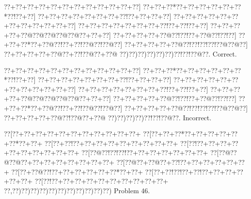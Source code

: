 \documentclass[a5paper]{article}
\begin{document}
\begin{center}
{\goo
\0??+\0??+\0??+\0??+\0??+\0??+\0??+\0??+\0??+\0??+\0??+\0??]
\0??+\0??+\0??*\0??+\0??+\0??+\0??+\0??+\0??*\0??!\0??+\0??]
\0??+\0??+\0??+\0??+\0??+\0??+\0??+\0??!\0??+\0??+\0??+\0??]
\0??+\0??+\0??+\0??+\0??+\0??+\0??+\0??+\0??+\0??+\0??+\0??]
\0??+\0??+\0??+\0??+\0??+\0??+\0??+\0??!\0??+\0??!\0??+\0??]
\0??+\0??+\0??+\0??+\0??@\0??@\0??@\0??@\0??@\0??+\0??+\0??]
\0??+\0??+\0??+\0??+\0??@\0??!\0??!\0??+\0??@\0??!\0??!\0??]
\0??+\0??+\0??*\0??+\0??@\0??!\0??+\0??!\0??@\0??!\0??@\0??]
\0??+\0??+\0??+\0??+\0??@\0??!\0??!\0??!\0??!\0??@\0??@\0??]
\0??+\0??+\0??+\0??+\0??@\0??+\0??!\0??@\0??+\0??@
\0??)\0??)\0??)\0??)\0??)\0??)\0??!\0??!\0??@\0??.
}
Correct. 

\end{center}
\begin{center}
{\goo
\0??+\0??+\0??+\0??+\0??+\0??+\0??+\0??+\0??+\0??+\0??+\0??]
\0??+\0??+\0??*\0??+\0??+\0??+\0??+\0??+\0??*\0??!\0??+\0??]
\0??+\0??+\0??+\0??+\0??+\0??+\0??+\0??!\0??+\0??+\0??+\0??]
\0??+\0??+\0??+\0??+\0??+\0??+\0??+\0??+\0??+\0??+\0??+\0??]
\0??+\0??+\0??+\0??+\0??+\0??+\0??+\0??!\0??+\0??!\0??+\0??]
\0??+\0??+\0??+\0??+\0??@\0??@\0??@\0??@\0??@\0??+\0??+\0??]
\0??+\0??+\0??+\0??+\0??@\0??!\0??!\0??+\0??@\0??!\0??!\0??]
\0??+\0??+\0??*\0??+\0??@\0??!\0??+\0??!\0??@\0??!\0??@\0??]
\0??+\0??+\0??+\0??+\0??@\0??!\0??!\0??!\0??!\0??@\0??@\0??]
\0??+\0??+\0??+\0??+\0??@\0??!\0??@\0??+\0??@
\0??)\0??)\0??)\0??)\0??!\0??!\0??@\0??.
}
Incorrect. 

\end{center}
\newpage
\begin{center}
{\goo
\0??[\0??+\0??+\0??+\0??+\0??+\0??+\0??+\0??+\0??+\0??+\0??+
\0??[\0??+\0??+\0??*\0??+\0??+\0??+\0??+\0??+\0??*\0??+\0??+
\0??[\0??+\0??!\0??+\0??+\0??+\0??+\0??+\0??+\0??+\0??+\0??+
\0??[\0??!\0??+\0??+\0??+\0??+\0??+\0??+\0??+\0??+\0??+\0??+
\0??[\0??@\0??!\0??!\0??!\0??+\0??+\0??+\0??+\0??+\0??+\0??+
\0??[\0??@\0??@\0??@\0??+\0??+\0??+\0??+\0??+\0??+\0??+\0??+
\0??[\0??@\0??+\0??@\0??+\0??!\0??+\0??+\0??+\0??+\0??+\0??+
\0??[\0??+\0??@\0??!\0??+\0??+\0??+\0??+\0??+\0??*\0??+\0??+
\0??[\0??+\0??!\0??!\0??+\0??!\0??+\0??+\0??+\0??+\0??+\0??+
\0??[\0??!\0??+\0??+\0??+\0??+\0??+\0??+\0??+\0??+\0??+\0??+
\0??,\0??)\0??)\0??)\0??)\0??)\0??)\0??)\0??)\0??)\0??)\0??)
}
Problem 46.

\end{center}
\end{document}
